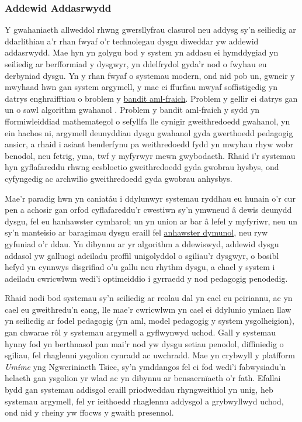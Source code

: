         \subsubsection{Addewid Addasrwydd}
Y gwahaniaeth allweddol rhwng gwersllyfrau clasurol neu addysg sy'n seiliedig ar ddarlithiau a'r rhan fwyaf o'r technolegau dysgu diweddar yw addewid addasrwydd. Mae hyn yn golygu bod y system yn addasu ei hymddygiad yn seiliedig ar berfformiad y dysgwyr, yn ddelfrydol gyda'r nod o fwyhau eu derbyniad dysgu. Yn y rhan fwyaf o systemau modern, ond nid pob un, gwneir y mwyhaad hwn gan system argymell, y mae ei ffurfiau mwyaf soffistigedig yn datrys enghraifftiau o broblem y \href{https://en.wikipedia.org/wiki/Multi-armed_bandit}{bandit aml-fraich}. Problem y gellir ei datrys gan un o sawl algorithm gwahanol \parencite{chen_recommendation_2017}. Problem y bandit aml-fraich y sydd yn fformiwleiddiad mathemategol o sefyllfa lle cynigir gweithredoedd gwahanol, yn ein hachos ni, argymell deunyddiau dysgu gwahanol gyda gwerthoedd pedagogig ansicr, a rhaid i asiant benderfynu pa weithredoedd fydd yn mwyhau rhyw wobr benodol, neu fetrig, yma, twf y myfyrwyr mewn gwybodaeth. Rhaid i'r systemau hyn gyflafareddu rhwng ecsbloetio gweithredoedd gyda gwobrau hysbys, ond cyfyngedig ac archwilio gweithredoedd gyda gwobrau anhysbys.

Mae'r paradig hwn yn caniatáu i ddylunwyr systemau ryddhau eu hunain o'r cur pen a achosir gan orfod cyflafareddu'r cwestiwn sy'n ymwneud â dewis deunydd dysgu, fel eu hanhawster cymharol; un yn union ar bar â lefel y myfyriwr, neu un sy'n manteisio ar baragimau dysgu eraill fel \href{https://en.wikipedia.org/wiki/Desirable_difficulty}{anhawster dymunol}, neu ryw gyfuniad o'r ddau. Yn dibynnu ar yr algorithm a ddewiswyd, addewid dysgu addasol yw galluogi adeiladu proffil unigolyddol o sgiliau'r dysgwyr, o bosibl hefyd yn cynnwys disgrifiad o'u gallu neu rhythm dysgu, a chael y system i adeiladu cwricwlwm wedi'i optimeiddio i gyrraedd y nod pedagogig penodedig.

Rhaid nodi bod systemau sy'n seiliedig ar reolau dal yn cael eu peiriannu, ac yn cael eu gweithredu'n eang, lle mae'r cwricwlwm yn cael ei ddylunio ymlaen llaw yn seiliedig ar fodel pedagogig (yn aml, model pedagogig y system ysgolheigion), gan chwarae rôl y systemau argymell a gyflwynwyd uchod. Gall y systemau hynny fod yn berthnasol pan mai'r nod yw dysgu setiau penodol, diffiniedig o sgiliau, fel rhaglenni ysgolion cynradd ac uwchradd. Mae \textcite{pelanek_adaptive_2025} yn crybwyll y platfform \textit{Umíme} yng Ngweriniaeth Tsiec, sy'n ymddangos fel ei fod wedi'i fabwysiadu'n helaeth gan ysgolion yr wlad ac yn dibynnu ar bensaernïaeth o'r fath. Efallai bydd gan systemau addisgol eraill priodweddau rhyngweithiol yn unig, heb systemau argymell, fel yr ieithoedd rhaglennu addysgol a grybwyllwyd uchod, ond nid y rheiny yw ffocws y gwaith presennol.

